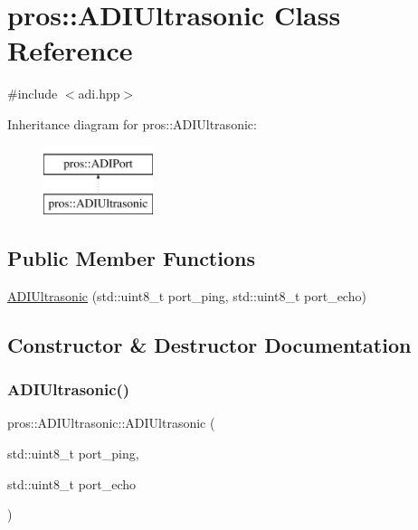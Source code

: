 \hypertarget{classpros_1_1ADIUltrasonic}{}\section{pros\+:\+:A\+D\+I\+Ultrasonic Class Reference}
\label{classpros_1_1ADIUltrasonic}


{\ttfamily \#include $<$adi.\+hpp$>$}

Inheritance diagram for pros\+:\+:A\+D\+I\+Ultrasonic\+:\begin{figure}[H]
\begin{center}
\leavevmode
\includegraphics[height=2.000000cm]{classpros_1_1ADIUltrasonic}
\end{center}
\end{figure}
\subsection*{Public Member Functions}
\begin{DoxyCompactItemize}
\item 
\hyperlink{classpros_1_1ADIUltrasonic_ae2b4cd186556af9602cc0017d324494b}{A\+D\+I\+Ultrasonic} (std\+::uint8\+\_\+t port\+\_\+ping, std\+::uint8\+\_\+t port\+\_\+echo)
\end{DoxyCompactItemize}


\subsection{Constructor \& Destructor Documentation}
\mbox{\label{classpros_1_1ADIUltrasonic_ae2b4cd186556af9602cc0017d324494b}} 
\subsubsection{\texorpdfstring{A\+D\+I\+Ultrasonic()}{ADIUltrasonic()}}
{\footnotesize\ttfamily pros\+::\+A\+D\+I\+Ultrasonic\+::\+A\+D\+I\+Ultrasonic (\begin{DoxyParamCaption}\item[{std\+::uint8\+\_\+t}]{port\+\_\+ping,  }\item[{std\+::uint8\+\_\+t}]{port\+\_\+echo }\end{DoxyParamCaption})}

